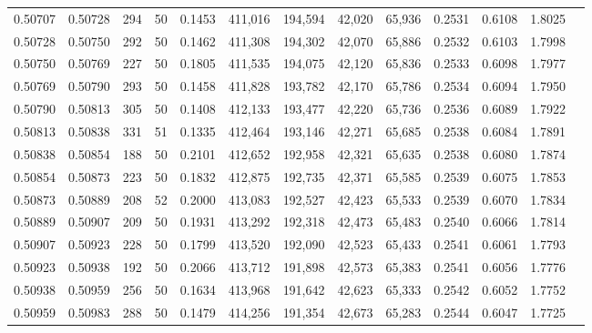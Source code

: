 \begin{tabular}{rrrrrrrrrrrrr}
0.50707 & 0.50728 &   294 &  50 &                                     0.1453 & 411,016 & 194,594 &  42,020 &  65,936 & 0.2531 & 0.6108 & 1.8025 \\
0.50728 & 0.50750 &   292 &  50 &                                     0.1462 & 411,308 & 194,302 &  42,070 &  65,886 & 0.2532 & 0.6103 & 1.7998 \\
0.50750 & 0.50769 &   227 &  50 &                                     0.1805 & 411,535 & 194,075 &  42,120 &  65,836 & 0.2533 & 0.6098 & 1.7977 \\
0.50769 & 0.50790 &   293 &  50 &                                     0.1458 & 411,828 & 193,782 &  42,170 &  65,786 & 0.2534 & 0.6094 & 1.7950 \\
0.50790 & 0.50813 &   305 &  50 &                                     0.1408 & 412,133 & 193,477 &  42,220 &  65,736 & 0.2536 & 0.6089 & 1.7922 \\
0.50813 & 0.50838 &   331 &  51 &                                     0.1335 & 412,464 & 193,146 &  42,271 &  65,685 & 0.2538 & 0.6084 & 1.7891 \\
0.50838 & 0.50854 &   188 &  50 &                                     0.2101 & 412,652 & 192,958 &  42,321 &  65,635 & 0.2538 & 0.6080 & 1.7874 \\
0.50854 & 0.50873 &   223 &  50 &                                     0.1832 & 412,875 & 192,735 &  42,371 &  65,585 & 0.2539 & 0.6075 & 1.7853 \\
0.50873 & 0.50889 &   208 &  52 &                                     0.2000 & 413,083 & 192,527 &  42,423 &  65,533 & 0.2539 & 0.6070 & 1.7834 \\
0.50889 & 0.50907 &   209 &  50 &                                     0.1931 & 413,292 & 192,318 &  42,473 &  65,483 & 0.2540 & 0.6066 & 1.7814 \\
0.50907 & 0.50923 &   228 &  50 &                                     0.1799 & 413,520 & 192,090 &  42,523 &  65,433 & 0.2541 & 0.6061 & 1.7793 \\
0.50923 & 0.50938 &   192 &  50 &                                     0.2066 & 413,712 & 191,898 &  42,573 &  65,383 & 0.2541 & 0.6056 & 1.7776 \\
0.50938 & 0.50959 &   256 &  50 &                                     0.1634 & 413,968 & 191,642 &  42,623 &  65,333 & 0.2542 & 0.6052 & 1.7752 \\
0.50959 & 0.50983 &   288 &  50 &                                     0.1479 & 414,256 & 191,354 &  42,673 &  65,283 & 0.2544 & 0.6047 & 1.7725 \\

\end{tabular}
